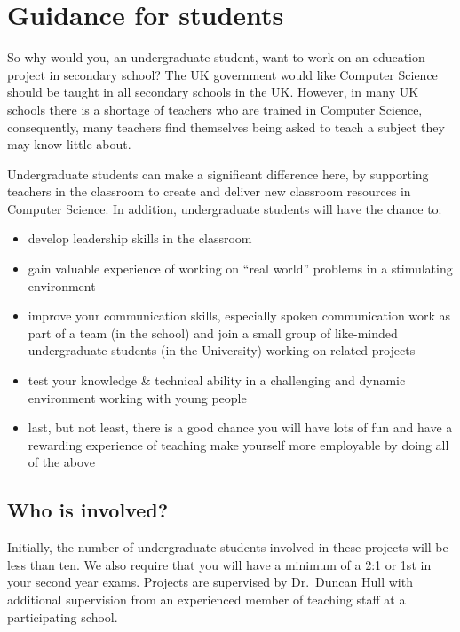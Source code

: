 \documentclass[12pt,]{book}
\providecommand{\tightlist}{%
  \setlength{\itemsep}{0pt}\setlength{\parskip}{0pt}}
\begin{document}
\hypertarget{guidance-for-students}{%
\section{Guidance for students}\label{guidance-for-students}}

So why would you, an undergraduate student, want to work on an education project in secondary school? The UK government would like Computer Science should be taught in all secondary schools in the UK. \citep{afterthereboot} However, in many UK schools there is a shortage of teachers who are trained in Computer Science, consequently, many teachers find themselves being asked to teach a subject they may know little about. \citep{shutdownrestart}

Undergraduate students can make a significant difference here, by supporting teachers in the classroom to create and deliver new classroom resources in Computer Science. \citep{computinged} In addition, undergraduate students will have the chance to:

\begin{itemize}
\tightlist
\item
  develop leadership skills in the classroom
\item
  gain valuable experience of working on ``real world'' problems in a stimulating environment
\item
  improve your communication skills, especially spoken communication
  work as part of a team (in the school) and join a small group of like-minded undergraduate students (in the University) working on related projects
\item
  test your knowledge \& technical ability in a challenging and dynamic environment working with young people
\item
  last, but not least, there is a good chance you will have lots of fun and have a rewarding experience of teaching
  make yourself more employable by doing all of the above
\end{itemize}

\hypertarget{who-is-involved}{%
\subsection{Who is involved?}\label{who-is-involved}}

Initially, the number of undergraduate students involved in these projects will be less than ten. We also require that you will have a minimum of a 2:1 or 1st in your second year exams. Projects are supervised by Dr.~Duncan Hull with additional supervision from an experienced member of teaching staff at a participating school.
\end{document}
